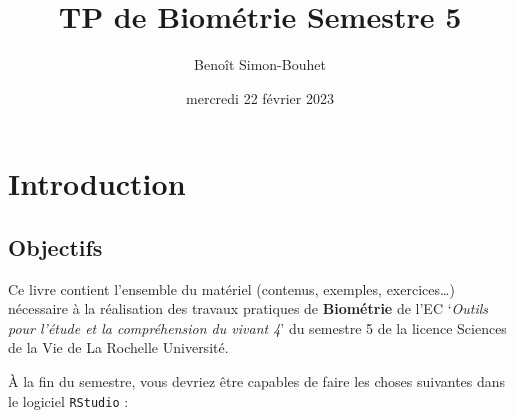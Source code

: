 \documentclass[
  a4paper,
  DIV=11,
  numbers=noendperiod,
  oneside]{scrreprt}
\title{TP de Biométrie Semestre 5}
\author{Benoît Simon-Bouhet}
\date{mercredi 22 février 2023}
\renewcommand*\contentsname{Table des matières}
\newcommand\contentsname{Table des matières}
\begin{document}
\maketitle
\ifdefined\Shaded\renewenvironment{Shaded}{\begin{tcolorbox}[breakable, enhanced, sharp corners, interior hidden, boxrule=0pt, borderline west={3pt}{0pt}{shadecolor}, frame hidden]}{\end{tcolorbox}}\fi

\renewcommand*\contentsname{Table des matières}
{
\hypersetup{linkcolor=}
\setcounter{tocdepth}{2}
\tableofcontents
}

\hypertarget{introduction}{%
\chapter*{Introduction}\label{introduction}}

\hypertarget{objectifs}{%
\section*{Objectifs}\label{objectifs}}

Ce livre contient l'ensemble du matériel (contenus, exemples,
exercices\ldots) nécessaire à la réalisation des travaux pratiques de
\textbf{Biométrie} de l'EC `\emph{Outils pour l'étude et la
compréhension du vivant 4}' du semestre 5 de la licence Sciences de la
Vie de La Rochelle Université.

À la fin du semestre, vous devriez être capables de faire les choses
suivantes dans le logiciel \texttt{RStudio} :
\end{document}
